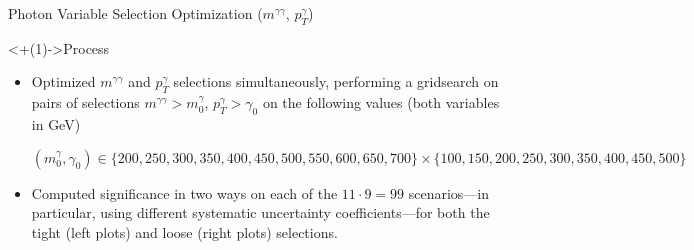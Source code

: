 \documentclass[]{beamer}
\begin{document}
\begin{frame}{Photon Variable Selection Optimization ($m^{\gamma \gamma}$, $p_T^{\gamma}$)}
    \begin{block}<+(1)->{Process}
        \begin{itemize}[<+(1)->]
            \item Optimized $m^{\gamma \gamma}$ and $p_T^{\gamma}$ selections simultaneously, performing a gridsearch on pairs of selections $m^{\gamma \gamma} > m^\gamma_0$, $p_T^\gamma > \gamma_0$ on the following values (both variables in GeV)
            
            \smallskip
            
            $(m^\gamma_0, \gamma_0) \in \{200, 250, 300, 350, 400, 450, 500, 550, 600, 650, 700\} \times \{100, 150, 200, 250, 300, 350, 400, 450, 500\}$
            
            \item Computed significance in two ways on each of the $11 \cdot 9 = 99$ scenarios---in particular, using different systematic uncertainty coefficients---for both the tight (left plots) and loose (right plots) selections.
        \end{itemize}
    \end{block}
    
    \bigskip
    
    \begin{columns}
    \end{columns}
    

\end{frame}
\end{document}
